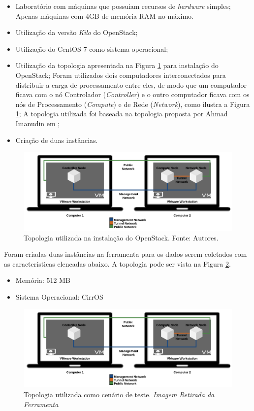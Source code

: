 \documentclass[conference]{IEEEtran}
\begin{document}
	\begin{itemize}
	 \item Laboratório com máquinas que possuiam recursos de \textit{hardware} simples;
	    \subitem Apenas máquinas com 4GB de memória RAM no máximo.
	 \item Utilização da versão \textit{Kilo} do OpenStack;
	 \item Utilização do CentOS 7 \cite{centos} como sistema operacional;
	 \item Utilização da topologia apresentada na Figura \ref{fig:topologia} para instalação do OpenStack;
	    \subitem Foram utilizados dois computadores interconectados para distribuir a carga de processamento entre eles, 
		  de modo que um computador ficava com o nó Controlador (\textit{Controller}) e o outro computador ficava
		     com os nós de Processamento (\textit{Compute}) e de Rede (\textit{Network}), como ilustra a Figura \ref{fig:topologia};
	    \subitem A topologia utilizada foi baseada na topologia proposta por Ahmad Imanudin em \cite{imanudin};
	  \item Criação de duas instâncias.
	\end{itemize}
	
	\begin{figure}[ht]
	\centering
	\includegraphics[width=.5\textwidth]{figuras/topologia.png}
	\caption{Topologia utilizada na instalação do OpenStack. Fonte: Autores.}
	\label{fig:topologia}
	\end{figure}
	
	Foram criadas duas instâncias na ferramenta para os dados serem coletados com as características elencadas abaixo. 
	A topologia pode ser vista na Figura \ref{fig:instancias}.

	\begin{itemize}
	 \item Memória: 512 MB
	 \item Sistema Operacional: CirrOS
	\end{itemize}
    
	 
	\begin{figure}[ht]
	\centering
	\includegraphics[width=.5\textwidth]{figuras/topologia.png}
	\caption{Topologia utilizada como cenário de teste. {\tiny \textit{Imagem Retirada da Ferramenta}}}
	\label{fig:instancias}
	\end{figure}
	
\end{document}
